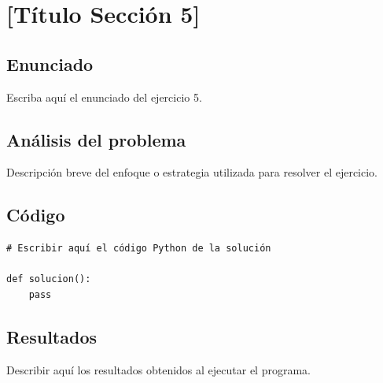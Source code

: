 
\section{[Título Sección 5]}

\subsection*{Enunciado}

\begin{tcolorbox}[colback=gray!8, colframe=gray!50, title=Ejercicio 5]
    Escriba aquí el enunciado del ejercicio 5.
\end{tcolorbox}

\subsection{Análisis del problema}

Descripción breve del enfoque o estrategia utilizada para resolver el ejercicio.

\subsection{Código}

\begin{lstlisting}[caption={Solución ejercicio 5}, label={lst:ej5}]
# Escribir aquí el código Python de la solución

def solucion():
    pass
\end{lstlisting}

\subsection{Resultados}

\begin{respuesta}
    Describir aquí los resultados obtenidos al ejecutar el programa.
\end{respuesta}


\newpage
